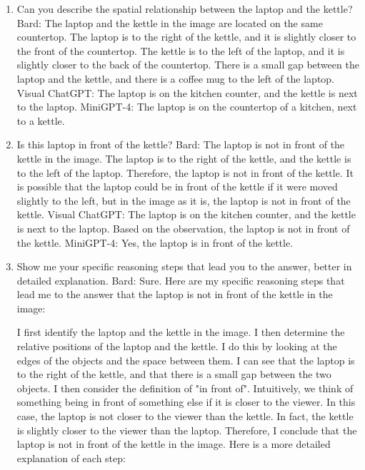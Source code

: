 \begin{enumerate}
    \item Can you describe the spatial relationship between the laptop and the kettle?
    \subitem Bard: 
    The laptop and the kettle in the image are located on the same countertop. The laptop is to the right of the kettle, and it is slightly closer to the front of the countertop. The kettle is to the left of the laptop, and it is slightly closer to the back of the countertop. There is a small gap between the laptop and the kettle, and there is a coffee mug to the left of the laptop.
    \subitem Visual ChatGPT: The laptop is on the kitchen counter, and the kettle is next to the laptop.
    \subitem MiniGPT-4: The laptop is on the countertop of a kitchen, next to a kettle.
    \item Is this laptop in front of the kettle?
    \subitem Bard: 
    The laptop is not in front of the kettle in the image. The laptop is to the right of the kettle, and the kettle is to the left of the laptop. Therefore, the laptop is not in front of the kettle. It is possible that the laptop could be in front of the kettle if it were moved slightly to the left, but in the image as it is, the laptop is not in front of the kettle.
    \subitem Visual ChatGPT: The laptop is on the kitchen counter, and the kettle is next to the laptop. Based on the observation, the laptop is not in front of the kettle.
    \subitem MiniGPT-4: Yes, the laptop is in front of the kettle.
    \item Show me your specific reasoning steps that lead you to the answer, better in detailed explanation.
    \subitem Bard: Sure. Here are my specific reasoning steps that lead me to the answer that the laptop is not in front of the kettle in the image:

    I first identify the laptop and the kettle in the image.
    I then determine the relative positions of the laptop and the kettle. I do this by looking at the edges of the objects and the space between them. I can see that the laptop is to the right of the kettle, and that there is a small gap between the two objects.
    I then consider the definition of "in front of". Intuitively, we think of something being in front of something else if it is closer to the viewer. In this case, the laptop is not closer to the viewer than the kettle. In fact, the kettle is slightly closer to the viewer than the laptop.
    Therefore, I conclude that the laptop is not in front of the kettle in the image.
    Here is a more detailed explanation of each step:
    

\end{enumerate}
